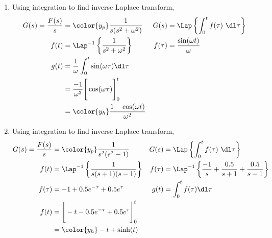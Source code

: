 \begin{enumerate}
    \item Using integration to find inverse Laplace transform,
          \begin{align}
              G(s) = \frac{F(s)}{s}     & = \color{y_p} \frac{1}{s(s^2 + \omega^2)} &
              G(s)                      & = \Lap\left\{ \int_{0}^{t}f(\tau)
              \ \dl \tau \right\}                                                     \\
              f(t)                      & = \Lap^{-1}\left\{ \frac{1}
              {s^2 + \omega^2} \right\} &
              f(\tau)                   & =  \frac{\sin(\omega t)}{\omega}            \\
              g(t)                      & = \frac{1}{\omega}\int_{0}^{t}
              \sin(\omega \tau) \dl \tau                                              \\
                                        & = \frac{-1}{\omega^2}
              \Bigg[ \cos(\omega \tau) \Bigg]_0^t                                     \\
                                        & = \color{y_h}\frac{1 - \cos(\omega t)}
              {\omega^2}
          \end{align}

    \item Using integration to find inverse Laplace transform,
          \begin{align}
              G(s) = \frac{F(s)}{s}  & = \color{y_p} \frac{1}{s^2(s^2 - 1)} &
              G(s)                   & = \Lap\left\{ \int_{0}^{t}f(\tau)
              \ \dl \tau \right\}                                             \\
              f(t)                   & = \Lap^{-1}\left\{ \frac{1}
              {s(s+1)(s-1)} \right\} &
              f(\tau)                & =  \Lap^{-1}\left\{ \frac{-1}{s}
              + \frac{0.5}{s+1} + \frac{0.5}{s-1} \right\}                    \\
              f(\tau)                & = -1 + 0.5e^{-\tau} + 0.5e^{\tau}    &
              g(t)                   & = \int_{0}^{t}
              f(\tau) \dl \tau                                                \\
              f(t)                   & = \Bigg[ -t - 0.5e^{-\tau}
              + 0.5e^{\tau} \Bigg]_0^t                                        \\
                                     & = \color{y_h} -t + \sinh(t)
          \end{align}


\end{enumerate}
